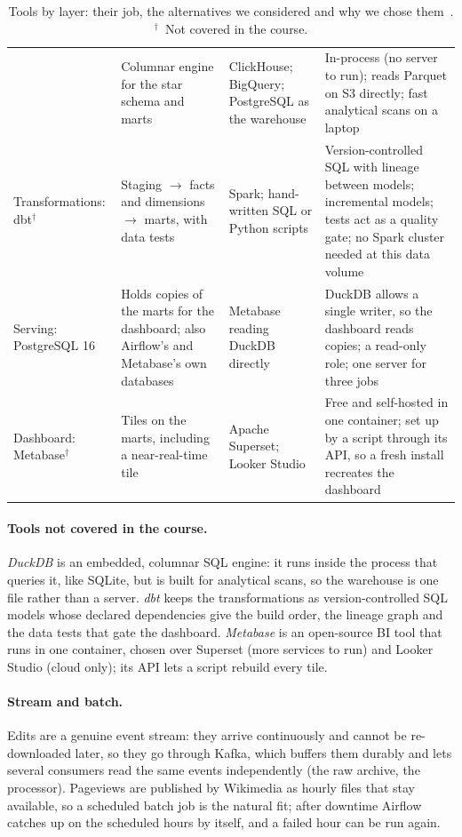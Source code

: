 \begin{table}[!htbp]
\begin{tabularx}{\textwidth}{@{}>{\raggedright\arraybackslash}p{2.6cm}
    >{\raggedright\arraybackslash}X >{\raggedright\arraybackslash}p{3.1cm} >{\raggedright\arraybackslash}X@{}}
  & Columnar engine for the star schema and marts
  & ClickHouse; BigQuery; PostgreSQL as the warehouse
  & In-process (no server to run); reads Parquet on S3 directly; fast analytical scans on a laptop \\
Transformations: dbt$^\dagger$
  & Staging $\rightarrow$ facts and dimensions $\rightarrow$ marts, with data tests
  & Spark; hand-written SQL or Python scripts
  & Version-controlled SQL with lineage between models; incremental models; tests act as a quality
    gate; no Spark cluster needed at this data volume \\
Serving: PostgreSQL 16
  & Holds copies of the marts for the dashboard; also Airflow's and Metabase's own databases
  & Metabase reading DuckDB directly
  & DuckDB allows a single writer, so the dashboard reads copies; a read-only role; one server for
    three jobs \\
Dashboard: Metabase$^\dagger$
  & Tiles on the marts, including a near-real-time tile
  & Apache Superset; Looker Studio
  & Free and self-hosted in one container; set up by a script through its API, so a fresh install
    recreates the dashboard \\
\bottomrule
\end{tabularx}
\caption{Tools by layer: their job, the alternatives we considered and why we chose
  them~\cite{airflow2026docs,kafka2026docs,dbt2026docs,duckdb2026docs,metabase2026docs,minio2026docs}.
  $^\dagger$~Not covered in the course.}
\label{tab:tools}
\end{table}

\paragraph{Tools not covered in the course.} \emph{DuckDB} is an embedded, columnar SQL engine: it runs
inside the process that queries it, like SQLite, but is built for analytical scans, so the warehouse is
one file rather than a server. \emph{dbt} keeps the transformations as version-controlled SQL models whose
declared dependencies give the build order, the lineage graph and the data tests that gate the dashboard.
\emph{Metabase} is an open-source BI tool that runs in one container, chosen over Superset (more services
to run) and Looker Studio (cloud only); its API lets a script rebuild every tile.

\paragraph{Stream and batch.} Edits are a genuine event stream: they arrive continuously and cannot be
re-downloaded later, so they go through Kafka, which buffers them durably and lets several consumers
read the same events independently (the raw archive, the processor). Pageviews are published by
Wikimedia as hourly files that stay available, so a scheduled batch job is the natural fit; after downtime
Airflow catches up on the scheduled hours by itself, and a failed hour can be run again.

